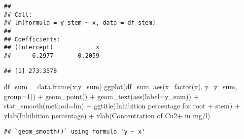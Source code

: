 \documentclass[
]{article}
\newenvironment{Shaded}{\begin{snugshade}}{\end{snugshade}}
\newcommand{\AttributeTok}[1]{\textcolor[rgb]{0.77,0.63,0.00}{#1}}
\newcommand{\DecValTok}[1]{\textcolor[rgb]{0.00,0.00,0.81}{#1}}
\newcommand{\FunctionTok}[1]{\textcolor[rgb]{0.00,0.00,0.00}{#1}}
\newcommand{\NormalTok}[1]{#1}
\newcommand{\OtherTok}[1]{\textcolor[rgb]{0.56,0.35,0.01}{#1}}
\newcommand{\SpecialCharTok}[1]{\textcolor[rgb]{0.00,0.00,0.00}{#1}}
\newcommand{\StringTok}[1]{\textcolor[rgb]{0.31,0.60,0.02}{#1}}
\begin{document}
\begin{verbatim}
## 
## Call:
## lm(formula = y_stem ~ x, data = df_stem)
## 
## Coefficients:
## (Intercept)            x  
##     -6.2977       0.2059
\end{verbatim}

\begin{Shaded}
\end{Shaded}

\begin{verbatim}
## [1] 273.3578
\end{verbatim}

\begin{Shaded}
\begin{Highlighting}[]
\NormalTok{df\_sum }\OtherTok{=} \FunctionTok{data.frame}\NormalTok{(x,y\_sum)}
\FunctionTok{ggplot}\NormalTok{(df\_sum, }\FunctionTok{aes}\NormalTok{(}\AttributeTok{x=}\FunctionTok{factor}\NormalTok{(x), }\AttributeTok{y=}\NormalTok{y\_sum, }\AttributeTok{group=}\DecValTok{1}\NormalTok{)) }\SpecialCharTok{+} \FunctionTok{geom\_point}\NormalTok{() }\SpecialCharTok{+} \FunctionTok{geom\_text}\NormalTok{(}\FunctionTok{aes}\NormalTok{(}\AttributeTok{label=}\NormalTok{y\_sum)) }\SpecialCharTok{+} \FunctionTok{stat\_smooth}\NormalTok{(}\AttributeTok{method=}\StringTok{\textquotesingle{}lm\textquotesingle{}}\NormalTok{) }\SpecialCharTok{+} \FunctionTok{ggtitle}\NormalTok{(}\StringTok{\textquotesingle{}Inhibition percentage for root + stem\textquotesingle{}}\NormalTok{) }\SpecialCharTok{+} \FunctionTok{ylab}\NormalTok{(}\StringTok{\textquotesingle{}Inhibition percentage\textquotesingle{}}\NormalTok{) }\SpecialCharTok{+} \FunctionTok{xlab}\NormalTok{(}\StringTok{\textquotesingle{}Concentration of Cu2+ in mg/l\textquotesingle{}}\NormalTok{)}
\end{Highlighting}
\end{Shaded}

\begin{verbatim}
## `geom_smooth()` using formula 'y ~ x'
\end{verbatim}
\end{document}
